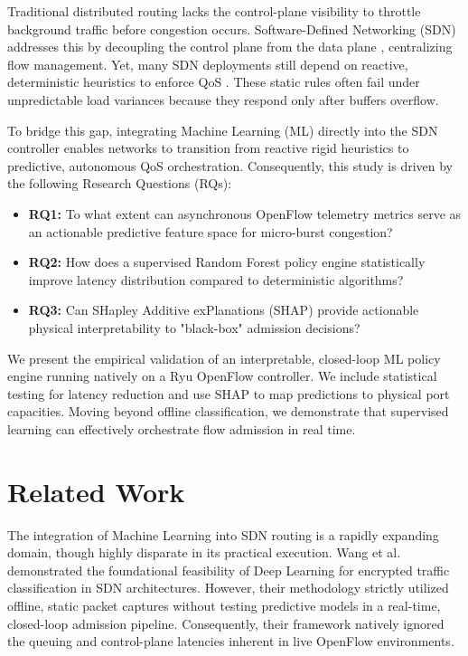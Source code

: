 \documentclass[journal]{IEEEtran}
\begin{document}
Traditional distributed routing lacks the control-plane visibility to throttle background traffic before congestion occurs. Software-Defined Networking (SDN) addresses this by decoupling the control plane from the data plane \cite{ref4}, centralizing flow management. Yet, many SDN deployments still depend on reactive, deterministic heuristics to enforce QoS \cite{ref5}. These static rules often fail under unpredictable load variances because they respond only after buffers overflow. 

To bridge this gap, integrating Machine Learning (ML) directly into the SDN controller enables networks to transition from reactive rigid heuristics to predictive, autonomous QoS orchestration. Consequently, this study is driven by the following Research Questions (RQs):
\begin{itemize}
    \item \textbf{RQ1:} To what extent can asynchronous OpenFlow telemetry metrics serve as an actionable predictive feature space for micro-burst congestion?
    \item \textbf{RQ2:} How does a supervised Random Forest policy engine statistically improve latency distribution compared to deterministic algorithms?
    \item \textbf{RQ3:} Can SHapley Additive exPlanations (SHAP) provide actionable physical interpretability to "black-box" admission decisions?
\end{itemize}

We present the empirical validation of an interpretable, closed-loop ML policy engine running natively on a Ryu OpenFlow controller. We include statistical testing for latency reduction and use SHAP to map predictions to physical port capacities. Moving beyond offline classification, we demonstrate that supervised learning can effectively orchestrate flow admission in real time.

\section{Related Work}
The integration of Machine Learning into SDN routing is a rapidly expanding domain, though highly disparate in its practical execution. Wang et al. \cite{ref1} demonstrated the foundational feasibility of Deep Learning for encrypted traffic classification in SDN architectures. However, their methodology strictly utilized offline, static packet captures without testing predictive models in a real-time, closed-loop admission pipeline. Consequently, their framework natively ignored the queuing and control-plane latencies inherent in live OpenFlow environments.
\end{document}
